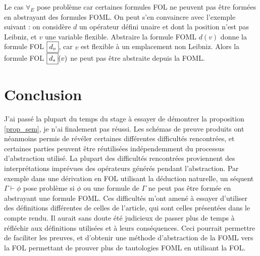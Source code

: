\documentclass[12pt]{article}
\newcommand{\FOL}{\ensuremath{\textup{\tiny{}FOL}}}
\newcommand{\raph}[1]{\textcolor{red}{#1}}
\begin{document}
\bigskip \bigskip
  
Le cas $\forall_E$ pose problème car certaines formules FOL ne peuvent pas être formées en abstrayant des formules FOML.
On peut s'en convaincre avec l'exemple suivant : on considère $d$ un opérateur défini unaire et dont la position n'est pas Leibniz, et $v$ une variable flexible.
Abstraire la formule FOML $d(v)$ donne la formule FOL \( \fbox{$d_v$} \), car $v$ est flexible à un emplacement non Leibniz.
Alors la formule FOL \( \fbox{$d_*$}(v) \) ne peut pas être abstraite depuis la FOML.

\section{Conclusion}

J'ai passé la plupart du temps du stage à essayer de démontrer la proposition \ref{prop_sem}, je n'ai finalement pas réussi.
Les schémas de preuve produits ont néanmoins permis de révéler certaines différentes difficultés rencontrées, et certaines parties peuvent être réutilisées indépendemment du processus d'abstraction utilisé.
La plupart des difficultés rencontrées proviennent des interprétations \og{}imprévues\fg{} des opérateurs générés pendant l'abstraction.
Par exemple dans une dérivation en FOL utilisant la déduction naturelle, un séquent $\Gamma \vdash \phi$ pose problème si $\phi$ ou une formule de $\Gamma$ ne peut pas être formée en abstrayant une formule FOML.
Ces difficultés m'ont amené à essayer d'utiliser des définitions différentes de celles de l'article, qui sont celles présentées dans le compte rendu.
Il aurait sans doute été judicieux de passer plus de temps à réfléchir aux définitions utilisées et à leurs conséquences.
Ceci pourrait permettre de faciliter les preuves, et d'obtenir une méthode d'abstraction de la FOML vers la FOL permettant de prouver plus de tautologies FOML en utilisant la FOL.
\end{document}
